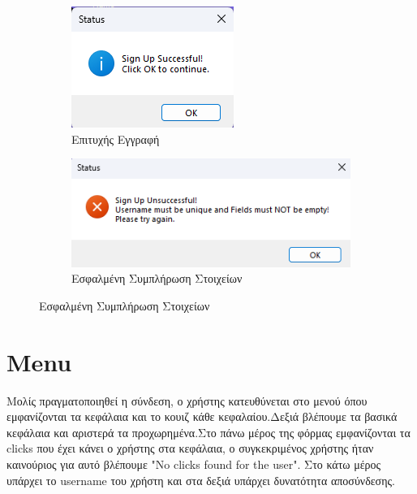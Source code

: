 \documentclass[12pt]{article}
\newcommand{\en}[1]{\foreignlanguage{English}{#1}}
\begin{document}
\begin{figure}
  \centering
  \begin{subfigure}{0.32\textwidth}
    \includegraphics[width=\linewidth]{signupmsg.png}
    \caption{Επιτυχής Εγγραφή}
    \label{fig:subfig1}
  \end{subfigure}
  \hfill
  \begin{subfigure}{0.53\textwidth}
    \includegraphics[width=\linewidth]{signuperrormsg.png}
    \caption{Εσφαλμένη Συμπλήρωση Στοιχείων}
    \label{fig:subfig2}
  \end{subfigure}

  \label{fig:two_images}
\end{figure}
\newpage
\section*{\en{Menu}}

Μολίς πραγματοποιηθεί η σύνδεση, ο χρήστης κατευθύνεται στο μενού όπου εμφανίζονται τα κεφάλαια και το κουιζ κάθε κεφαλαίου.Δεξιά βλέπουμε τα βασικά κεφάλαια και αριστερά τα προχωρημένα.Στο πάνω μέρος της φόρμας εμφανίζονται τα \en{clicks} που έχει κάνει ο χρήστης στα κεφάλαια, ο συγκεκριμένος χρήστης ήταν καινούριος για αυτό βλέπουμε "\en{No clicks found for the user".} Στο κάτω μέρος υπάρχει το \en{username} του χρήστη και στα δεξιά υπάρχει δυνατότητα αποσύνδεσης.
\end{document}
